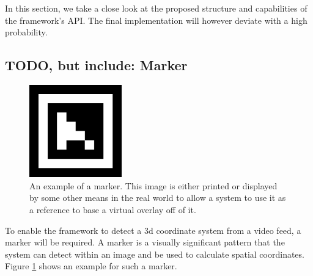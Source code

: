 In this section, we take a close look at the proposed structure and capabilities of the framework's API.
The final implementation will however deviate with a high probability.

\subsection{TODO, but include: Marker}

\begin{figure}
	\centering
	\includegraphics[width=4cm]{images/marker_example.png}
	\caption[Example Marker.]{An example of a marker. This image is either printed or displayed by some other means in the real world to allow a system to use it as a reference to base a virtual overlay off of it.}
	\label{fig:marker_example}
\end{figure}

To enable the framework to detect a 3d coordinate system from a video feed, a marker will be required.
A marker is a visually significant pattern that the system can detect within an image and be used to calculate spatial coordinates. Figure \ref{fig:marker_example} shows an example for such a marker.
